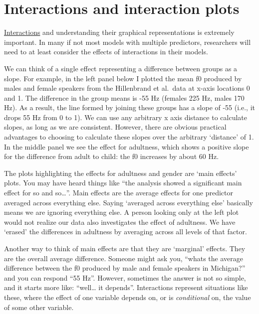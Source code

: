 \documentclass[
]{book}
\begin{document}
\hypertarget{interactions-and-interaction-plots}{%
\section{Interactions and interaction plots}\label{interactions-and-interaction-plots}}

\href{http://glimo.vub.ac.be/downloads/interaction.htm}{Interactions} and understanding their graphical representations is extremely important. In many if not most models with multiple predictors, researchers will need to at least consider the effects of interactions in their models.

We can think of a single effect representing a difference between groups as a slope. For example, in the left panel below I plotted the mean f0 produced by males and female speakers from the Hillenbrand et al.~data at x-axis locations 0 and 1. The difference in the group means is -55 Hz (females 225 Hz, males 170 Hz). As a result, the line formed by joining these groups has a slope of -55 (i.e., it drops 55 Hz from 0 to 1). We can use any arbitrary x axis distance to calculate slopes, as long as we are consistent. However, there are obvious practical advantages to choosing to calculate these slopes over the arbitrary `distance' of 1. In the middle panel we see the effect for adultness, which shows a positive slope for the difference from adult to child: the f0 increases by about 60 Hz.

The plots highlighting the effects for adultness and gender are `main effects' plots. You may have heard things like ``the analysis showed a significant main effect for so and so\ldots{}''. Main effects are the average effects for one predictor averaged across everything else. Saying `averaged across everything else' basically means we are ignoring everything else. A person looking only at the left plot would not realize our data also investigates the effect of adultness. We have `erased' the differences in adultness by averaging across all levels of that factor.

Another way to think of main effects are that they are `marginal' effects. They are the overall average difference. Someone might ask you, ``whats the average difference between the f0 produced by male and female speakers in Michigan?'' and you can respond ``55 Hz''. However, sometimes the answer is not so simple, and it starts more like: ``well\ldots{} it depends''. Interactions represent situations like these, where the effect of one variable depends on, or is \emph{conditional} on, the value of some other variable.
\end{document}
